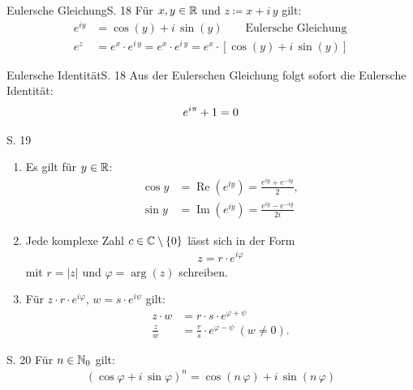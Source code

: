 \begin{bemerkung}{Eulersche Gleichung}{S. 18}
  Für $x, y \in \mathbb{R}$ und $z \coloneqq x + i\,y$ gilt:
  \begin{align}
    e^{iy} &= \cos(y) + i \, \sin(y) \qquad \text{Eulersche Gleichung}\\
    e^z &= e^x \cdot e^{i \, y} = e^x \cdot e^{i \, y} = e^x \cdot \left[ \cos(y) + i \, \sin(y) \right]
  \end{align}
\end{bemerkung}

\begin{bemerkung}{Eulersche Identität}{S. 18}
  Aus der Eulerschen Gleichung folgt sofort die Eulersche Identität:
  {
    \Huge
    \begin{align}
      e^{i\pi} + 1 = 0 \notag
    \end{align}
  }
\end{bemerkung}

\begin{satz}{S. 19}
  \label{satz:1_4}
  \begin{enumerate}
    \item Es gilt für $y \in \mathbb{R}$:
      \begin{align}
        \cos y &= \operatorname{Re}\left( e^{iy} \right) = \frac{e^{iy} + e^{-iy}}{2},\\
        \sin y &= \operatorname{Im}\left( e^{iy} \right) = \frac{e^{iy} - e^{-iy}}{2i}
      \end{align}
    \item Jede komplexe Zahl $c \in \mathbb{C}\setminus\{0\}$ lässt sich in der Form
      \begin{align}
        z = r \cdot e^{i\varphi}
      \end{align}
      mit $r = |z|$ und $\varphi = \operatorname{arg}(z)$ schreiben.
    \item Für $z \cdot r \cdot e^{i\varphi}$, $w = s \cdot e^{i\psi}$ gilt:
      \begin{align}
        z \cdot w &= r \cdot s \cdot e^{\varphi + \psi}\\
        \frac{z}{w} &= \frac{r}{s} \cdot e^{\varphi - \psi} \ (w \neq 0).
      \end{align}
  \end{enumerate}
\end{satz}

\begin{satz}{S. 20}
  \label{satz:1_5}
  Für $n \in \mathbb{N}_0$ gilt:
  \begin{align}
    \left( \cos \varphi + i \, \sin \varphi \right)^n = \cos \left( n \, \varphi \right) + i \, \sin \left( n \, \varphi \right)
  \end{align}
\end{satz}



